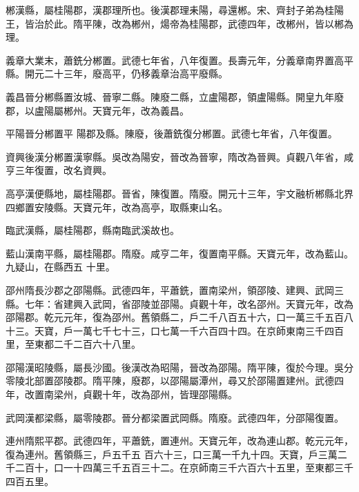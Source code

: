 \begin{pinyinscope}
 郴漢縣，屬桂陽郡，漢郡理所也。後漢郡理耒陽，尋還郴。宋、齊封子弟為桂陽王，皆治於此。隋平陳，改為郴州，煬帝為桂陽郡，武德四年，改郴州，皆以郴為理。



 義章大業末，蕭銑分郴置。武德七年省，八年復置。長壽元年，分義章南界置高平縣。開元二十三年，廢高平，仍移義章治高平廢縣。



 義昌晉分郴縣置汝城、晉寧二縣。陳廢二縣，立盧陽郡，領盧陽縣。開皇九年廢郡，以盧陽屬郴州。天寶元年，改為義昌。



 平陽晉分郴置平
 陽郡及縣。陳廢，後蕭銑復分郴置。武德七年省，八年復置。



 資興後漢分郴置漢寧縣。吳改為陽安，晉改為晉寧，隋改為晉興。貞觀八年省，咸亨三年復置，改名資興。



 高亭漢便縣地，屬桂陽郡。晉省，陳復置。隋廢。開元十三年，宇文融析郴縣北界四鄉置安陵縣。天寶元年，改為高亭，取縣東山名。



 臨武漢縣，屬桂陽郡，縣南臨武溪故也。



 藍山漢南平縣，屬桂陽郡。隋廢。咸亨二年，復置南平縣。天寶元年，改為藍山。九疑山，在縣西五
 十里。



 邵州隋長沙郡之邵陽縣。武德四年，平蕭銑，置南梁州，領邵陵、建興、武岡三縣。七年：省建興入武岡，省邵陵並邵陽。貞觀十年，改名邵州。天寶元年，改為邵陽郡。乾元元年，復為邵州。舊領縣二，戶二千八百五十六，口一萬三千五百八十三。天寶，戶一萬七千七十三，口七萬一千六百四十四。在京師東南三千四百里，至東都二千二百六十八里。



 邵陽漢昭陵縣，屬長沙國。後漢改為昭陽，晉改為邵陽。隋平陳，復於今理。吳分零陵北部置邵陵郡。隋平陳，廢郡，以邵陽屬潭州，尋又於邵陽置建州。武德四年，改置南梁州，貞觀十年，改為邵州，皆理邵陽縣。



 武岡漢都梁縣，屬零陵郡。晉分都梁置武岡縣。隋廢。武德四年，分邵陽復置。



 連州隋熙平郡。武德四年，平蕭銑，置連州。天寶元年，改為連山郡。乾元元年，復為連州。舊領縣三，戶五千五
 百六十三，口三萬一千九十四。天寶，戶三萬二千二百十，口一十四萬三千五百三十二。在京師南三千六百六十五里，至東都三千四百五里。




\end{pinyinscope}
